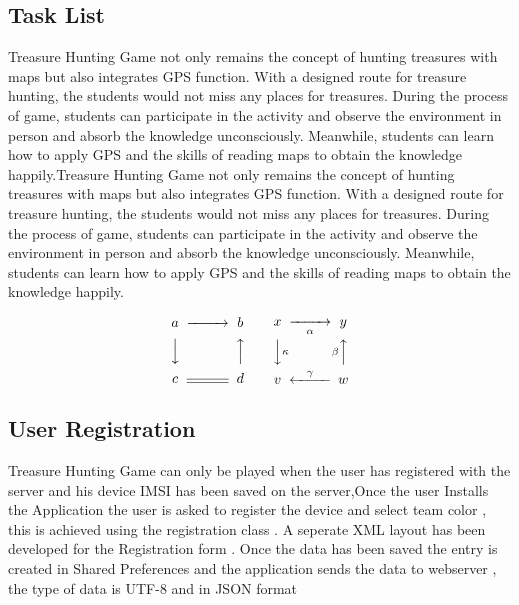 \subsection{Task List}

Treasure Hunting Game not only remains the concept of hunting treasures with maps but also integrates GPS function. With a designed route for treasure hunting, the students would not miss any places for treasures. During the process of game, students can participate in the activity and observe the environment in person and absorb the knowledge unconsciously. Meanwhile, students can learn how to apply GPS and the skills of reading maps to obtain the knowledge happily.Treasure Hunting Game not only remains the concept of hunting treasures with maps but also integrates GPS function. With a designed route for treasure hunting, the students would not miss any places for treasures. During the process of game, students can participate in the activity and observe the environment in person and absorb the knowledge unconsciously. Meanwhile, students can learn how to apply GPS and the skills of reading maps to obtain the knowledge happily.

\begin{equation*}
  \begin{CD}
    a @>>> b \\
    @VVV @AAA \\
    c @= d
  \end{CD}
  \qquad
  \begin{CD}
    x @>>\alpha> y \\
    @VV\kappa V @A\beta AA \\
    v @<\gamma<< w
  \end{CD}

\end{equation*}

%


\subsection{User Registration}

Treasure Hunting Game can only be played when the user has registered with the server and his device IMSI has been saved on the server,Once the user Installs the Application the user is asked to register the device and select team color , this is achieved using the registration class . A seperate XML layout has been developed for the Registration form . Once the data has been saved the entry is created in Shared Preferences and the application sends the data to webserver , the type of data is UTF-8 and in JSON format

